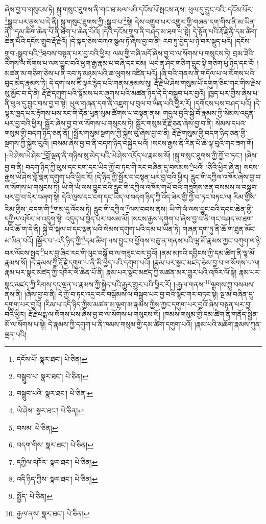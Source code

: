 ཞེས་བྱ་བ་གསུངས་ཏེ། སྐུ་གསུང་ཐུགས་ནི་གང་ཐ་མལ་པའི་དངོས་པོ་སྤངས་ནས། ཕུལ་དུ་བྱུང་བའི་:དངོས་པོར་\footnote{དངོས་པོ་  སྣར་ཐང་།  པེ་ཅིན། }སྒྲུབ་པར་ནུས་པ་དེ་ནི། སྐུ་གསུང་ཐུགས་ཀྱི་:སྒྲུབ་པ་\footnote{བསྒྲུབ་པ་  སྣར་ཐང་།  པེ་ཅིན། }སྟེ། དེས་འགྲུབ་པར་འགྱུར་གྱི་གཞན་དག་གིས་ནི་མ་ཡིན་ནོ། །དམ་ཚིག་ཆེན་པོ་ནི་ཐེག་པ་ཆེན་པོའོ། །དེའི་དངོས་གྲུབ་ནི་བཤད་མ་ཐག་པ་སྟེ། དེ་སྟོན་པའི་རྡོ་རྗེ་ནི་དམ་ཚིག་ཆེན་པོའི་དངོས་གྲུབ་རྡོ་རྗེའོ། །དེ་སྐད་ཅེས་བཀའ་སྩལ་ཏོ་ཞེས་བྱ་བ་ནི། རབ་ཏུ་བྱེད་པ་ཉེ་བར་སྡུད་པའོ། །དངོས་གྲུབ་:སྒྲུབ་པའི་\footnote{བསྒྲུབ་པའི་  སྣར་ཐང་།  པེ་ཅིན། }ཐབས་བསྟན་པར་བྱ་བའི་ཕྱིར། ལམ་གྱི་བཞི་མདོ་ཞེས་བྱ་བ་ལ་སོགས་པ་གསུངས་ཏེ། བྲམ་ཟེའི་རིགས་ལ་སོགས་པ་ལས་བྱུང་བའི་ཕྱག་རྒྱ་རྣམ་པ་བཞི་དང་ངམ། ཡང་ན་ཤིང་གཅིག་དྲུང་སྟེ་གཅིག་པུ་ཉིད་དང་ངོ། །མཚན་མ་གཅིག་ཅེས་པ་ནི་རབ་ཏུ་མཉམ་པའི་ཆ་ལུགས་འཛིན་པའོ། །ཞི་བའི་གནས་ནི་གདོལ་པ་ལ་སོགས་པའི་བུད་མེད་རྣམས་ཏེ། དེ་དག་ལས་ཇི་ལྟར་རྙེད་པའི་གནས་རྣམས་སུ། རྡོ་རྗེ་ཡེ་ཤེས་གསུམ་པོ་དགུག་ཅིང་གང་གིས་རྗེས་སུ་མྱོང་བ་དེ་ནི། རྡོ་རྗེ་དགུག་པའི་སྙོམས་པར་ཞུགས་པའི་མཚན་ཉིད་དེ་དེ་བསྒྲུབ་པར་བྱའོ། །ཁྱད་པར་གྱིས་ཞེས་པ་ནི་ཕུལ་དུ་བྱུང་བས་བྱ་བ་སྟེ། ཡུལ་གཞན་དག་ནི་འཇུག་པ་བུལ་བ་ཡིན་པའི་ཕྱིར་རོ། །དགོངས་པས་བཤད་པའོ། །དེ་ལྟར་ཁྱད་པར་རྟོགས་པས་རང་གི་དོན་ཕུན་སུམ་ཚོགས་པ་བསྟན་ནས། གདུལ་བྱའི་སྐྱེ་བོ་རྣམས་ཀྱི་སེམས་འདུན་པར་བྱ་བའི་ཕྱིར། སྦྱོར་ཞེས་བྱ་བ་ལ་སོགས་པ་གསུངས་ཏེ། སྦྱོར་གསུམ་རྡོ་རྗེ་ཅན་ཞེས་བྱ་བ་ནི། སེམས་དཔའ་གསུམ་གྱི་བདག་ཉིད་ཅན་ནོ། །སྦྱོར་གསུམ་སྔགས་ཀྱི་སྐྱེས་བུ་ཞེས་བྱ་བ་ནི། རྡོ་རྗེ་གསུམ་གྱི་བདག་ཉིད་ཅན་གྱི་སྔགས་ཀྱི་སྐྱེས་བུའོ། །བསམ་ཞེས་བྱ་བ་ནི་བདག་ཉིད་བསྐྱེད་པའོ། །སངས་རྒྱས་ནི་རིན་པོ་ཆེ་ལྟ་བུའི་གང་ཟག་གོ། །:ཡེ་ཤེས་ཡེ་ཤེས་\footnote{ཡེ་ཤེས་  སྣར་ཐང་།  པེ་ཅིན། }བློ་ལྡན་ནི་གཉིས་སུ་མེད་པའི་ཡེ་ཤེས་འདོད་པ་རྣམས་སོ། །སྐུ་གསུང་ཐུགས་ཀྱི་ཀྱོ་བ་ཏང་། །ཞེས་བྱ་བ་ནི། བདག་ཉིད་ཀྱི་ལུས་དང་ངག་དང་ཡིད་ཀྱོ་བ་ཏང་གི་རང་བཞིན་དུ་བསམས་\footnote{བསམ་  པེ་ཅིན། }པའོ། །ཅིའི་ཕྱིར་ཞེ་ན། སངས་རྒྱས་ཡེ་ཤེས་བློ་ལྡན་དགུག་པའི་ཕྱིར་རོ། །དེ་ཉིད་ཀྱི་སྦྱོར་བ་བསྟན་པར་བྱ་བའི་ཕྱིར། རླུང་གི་དཀྱིལ་འཁོར་ཞེས་བྱ་བ་ལ་སོགས་པ་གསུངས་ཏེ། ཡི་གེ་ཡཾ་ལས་བྱུང་བའི་རླུང་གི་དཀྱིལ་འཁོར་གཡོ་བའི་གཟུགས་ཅན་བསམས་ལ་བསྒྲུབ་པར་བྱ་བ་དེར་བཞག་སྟེ། དེའི་ལུས་དང་ངག་དང་ཡིད་ལ་བདག་ཉིད་ཀྱི་འོད་ཟེར་གྱི་ཀྱོ་བ་ཏང་བཏང་ལ། རིམ་གྱིས་རིམ་གྱིས་:བདག་གི་\footnote{བདག་གིས་  སྣར་ཐང་།  པེ་ཅིན། }གམ་དུ་འོངས་ཏེ། རླུང་གི་དཀྱིལ་\footnote{དཀྱིལ་འཁོར་  སྣར་ཐང་།  པེ་ཅིན། }ལས་བབས་ནས། ཡི་གེ་ལཾ་ལས་བྱུང་བའི་དབང་ཆེན་གྱི་དཀྱིལ་འཁོར་ལ་འདུག་སྟེ། འདུད་པ་བྱེད་པར་བསམ་མོ། །སངས་རྒྱས་དགུག་པ་ཞེས་བྱ་བ་ནི་གང་བཤད་མ་ཐག་པའི་ཆོ་ག་དེ་ནི། སྐྱེ་བོ་སྐལ་བ་དང་ལྡན་པའི་སེམས་དགུག་པའི་དམ་པ་ཡིན་ཏེ། གཞན་དག་ཏུ་ནི་ཆོ་ག་ཐུན་མོང་མ་ཡིན་བའོ། །སྦྱོར་བ་:འདི་ཉིད་ཀྱི་\footnote{འདི་ཉིད་ཀྱིས་  སྣར་ཐང་།  པེ་ཅིན། }དམ་ཚིག་ལས་བྱུང་བ་ཕྱོགས་བཅུ་ན་གནས་པའི་ལྷ་མོ་རྣམས་ཀྱང་བཀུག་ལ་ཉེ་བར་ལོངས་སྤྱད་\footnote{སྤྱོད་  པེ་ཅིན། }པར་བྱ་ཞིང་རང་གི་ལུང་བསྒོ་བ་ལ་གཟུང་བར་བྱའོ། །ནམ་མཁའི་དབྱིངས་ཀྱི་དམ་ཚིག་ནི་ལྷ་མོ་རྣམས་སོ། །དེ་རྣམས་ཀྱི་རྡོ་རྗེ་དགུག་པ་ནི་མི་ཕྱེད་པའི་དགུག་པའོ། །རྣམ་པར་སྣང་མཛད་ཅེས་བྱ་བ་ལ་སོགས་པ་ལ། རྣམ་པར་སྣང་མཛད་ཀྱི་འཁོར་ལོ་ཆེན་པོ་ནི། རྣམ་པར་སྣང་མཛད་ཀྱི་མཚན་མར་གྱུར་པའི་འཁོར་ལོ་སྟེ། རྣམ་པར་སྣང་མཛད་ཀྱི་རིགས་དང་ལྡན་པ་རྣམས་ཀྱི་སྐྱེད་པའི་རྒྱུར་གྱུར་པའི་ཕྱིར་རོ། །:རྒྱལ་གནས་\footnote{རྒྱལ་ནས་  སྣར་ཐང་།  པེ་ཅིན། }ལྕགས་ཀྱུ་བསམས་ནས་ནི། །ཞེས་བྱ་བ་ནི། དེ་ཀྱོ་བ་ཏང་འདྲ་བར་བསྒོམས་ལ་བསྒྲུབ་པར་བྱ་བའི་སྙིང་གར་བཏང་སྟེ། སྔ་མ་བཞིན་དུ་དགུག་པར་བྱའོ། །རིམ་པ་འདི་ཉིད་ཀྱིས་མཚན་མ་ལྷག་མ་རྣམས་ཀྱིས་ཀྱང་དགུག་པར་བྱའོ་ཞེས་བསྟན་པར་བྱ་བའི་ཕྱིར། རྡོ་རྗེ་པདྨ་ལ་སོགས་པས་ཞེས་བྱ་བ་ལ་སོགས་པ་གསུངས་སོ། །ཁམས་གསུམ་གྱི་དམ་ཚིག་ནི་གནོད་སྦྱིན་མོ་ལ་སོགས་པ་སྟེ། དེ་རྣམས་ཀྱི་དགུག་པ་ནི་ཁམས་གསུམ་གྱི་དམ་ཚིག་དགུག་པའོ། །རྣམ་པའི་མཆོག་རྣམས་ཀུན་ལྡན་པའི། 